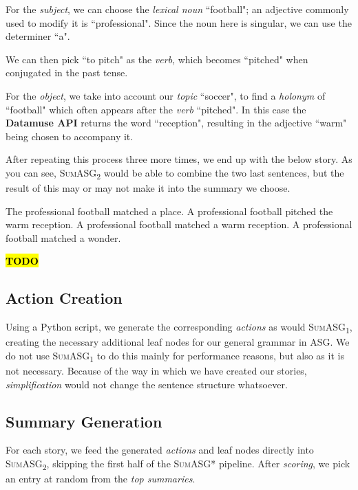 For the \textit{subject}, we can choose the \textit{lexical noun} ``football"; an adjective commonly used to modify it is ``professional". Since the noun here is singular, we can use the determiner ``a".

We can then pick ``to pitch" as the \textit{verb}, which becomes ``pitched" when conjugated in the past tense.

For the \textit{object}, we take into account our \textit{topic} ``soccer", to find a \textit{holonym} of ``football" which often appears after the \textit{verb} ``pitched". In this case the \textbf{Datamuse API} returns the word ``reception", resulting in the adjective ``warm" being chosen to accompany it.

After repeating this process three more times, we end up with the below story. As you can see, \textsc{SumASG\textsubscript{2}} would be able to combine the two last sentences, but the result of this may or may not make it into the summary we choose.

\begin{displayquote}
The professional football matched a place. A professional football pitched the warm reception. A professional football matched a warm reception. A professional football matched a wonder.
\end{displayquote}

\textcolor{red}{\textbf{\hl{TODO}}}

\subsection{Action Creation}

Using a Python script, we generate the corresponding \textit{actions} as would \textsc{SumASG\textsubscript{1}}, creating the necessary additional leaf nodes for our general grammar in ASG. We do not use \textsc{SumASG\textsubscript{1}} to do this mainly for performance reasons, but also as it is not necessary. Because of the way in which we have created our stories, \textit{simplification} would not change the sentence structure whatsoever.

\subsection{Summary Generation}

For each story, we feed the generated \textit{actions} and leaf nodes directly into \textsc{SumASG\textsubscript{2}}, skipping the first half of the \textsc{SumASG*} pipeline. After \textit{scoring}, we pick an entry at random from the \textit{top summaries}.

